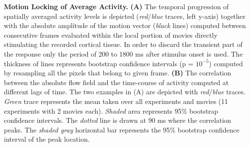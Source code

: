 \textbf{Motion Locking of Average Activity.} \textbf{(A)} The temporal
progression of spatially averaged activity levels is depicted (\textit{red}/\textit{blue}
traces, left y-axis) together with the absolute amplitude of the motion
vector (\textit{black} lines) computed between consecutive frames evaluated within
the local portion of movies directly stimulating the recorded cortical
tissue. In order to discard the transient part of the response only the
period of 200 to 1800 ms after stimulus onset is used. The thickness of
lines represents bootstrap confidence intervals (p = $10^{-5}$) computed by
resampling all the pixels that belong to given frame.  \textbf{(B)} The
correlation between the absolute flow field and the time-course of activity
computed at different lags of time. The two examples in (A) are depicted
with \textit{red}/\textit{blue} traces. \textit{Green} trace represents the
mean taken over all experiments and movies (11 experiments with 2 movies
each). \textit{Shaded} area represents 95\% bootstrap confidence intervals.
The \textit{dotted} line is drawn at 90 ms where the correlation peaks. The
\textit{shaded gray} horizontal bar represents the 95\% bootstrap
confidence interval of the peak location.



